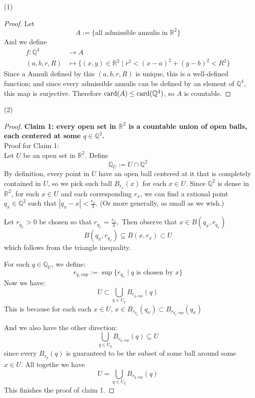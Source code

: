 \documentclass[lang=cn,11pt]{elegantbook}
\begin{document}
(1) \begin{proof} Let 
\[ A:=   \{     \text{all admissible annulis in $\mathbb{R}^2$}   \}\]
And we define 
\begin{align}
     f:\mathbb{Q}^4   & \to A \\
    (a,b,r,R)  & \mapsto \{(x, y) \in \mathbb{R}^2 \mid r^2 < (x - a)^2 + (y - b)^2 < R^2\}
\end{align}
Since a Annuli defined by this $(a,b,r,R)$ is unique, this is a well-defined function; and since every admissible annulis can be defined by an element of $\mathbb{Q}^4$, this map is surjective. Therefore $\operatorname{card}(A) \leq \operatorname{card}(\mathbb{Q}^4)$, so $A$ is countable.
\end{proof}
(2) 
\begin{proof}
\noindent \textbf{Claim 1: every open set in $\mathbb{R}^2$ is a countable union of open balls, each centered at some $q\in \mathbb{Q}^2$.}\\
\noindent Proof for Claim 1:\\
\noindent Let $U$ be an open set in $\mathbb{R}^2$.
\noindent Define
\[\mathbb{Q}_U  :=    U \cap \mathbb{Q}^2\]
\noindent By definition, every point in $U$ have an open ball centered at it that is completely contained in $U$, so we pick such ball $B_{r_x}(x)$ for each $x \in U$.
\noindent Since \(\mathbb{Q}^2\) is dense in \(\mathbb{R}^2\), for each \(x \in U\) and each corresponding \(r_x\), we can find a rational point \(q_x \in \mathbb{Q}^2\) such that \(|q_x - x| < \frac{r_x}{3}\). (Or more generally, as small as we wish.)

\noindent Let \(r_{q_x} > 0\) be chosen so that 
   \(
     r_{q_x} = \frac{r_x}{3},
   \)
Then observe that $x \in   B(q_x, r_{q_x}) $
     \[
     B(q_x, r_{q_x}) \subsetneq B(x, r_x) \subset U
   \]
\noindent   which follows from the triangle inequality.

For each $q \in \mathbb{Q}_U$, we define:
\[ r_{q,sup} := \sup\{  r_{q_x}  \mid q  \text{ is chosen by } x         \}     \]
Now we have:
\[  U \subset \bigcup_{q \in U_q}  B_{r_{q,sup}} (q)  \]
\noindent  This is because for each each $x \in U$, $x \in B_{r_{q_x}}(q_x) \subset B_{r_{q_x,sup}}(q_x)$

And we also have the other direction:
\[ \bigcup_{q \in U_q}  B_{r_{q,sup}} (q)   \subseteq U\]
since every $B_{r_q}(q)$ is guaranteed to be the subset of some ball around some $x \in U$. 
All togethe we have
\[
 U = \bigcup_{q \in U_q}  B_{r_{q,sup}} (q)
\]
This finishes the proof of claim 1.


\end{proof}
\end{document}

